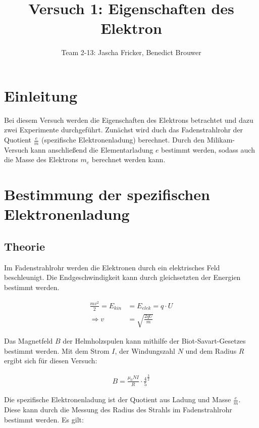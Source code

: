 \documentclass[11pt, a4paper]{article}
\title{Versuch 1: Eigenschaften des Elektron}
\author{Team 2-13: Jascha Fricker, Benedict Brouwer}
\begin{document}
    \maketitle


    \tableofcontents

    \newpage

    \section{Einleitung}

    Bei diesem Versuch werden die Eigenschaften des Elektrons betrachtet und dazu zwei Experimente durchgeführt. Zunächst wird duch das Fadenstrahlrohr
    der Quotient $\frac{e}{m}$ (spezifische Elektronenladung) berechnet. Durch den Milikam-Versuch kann anschließend die Elementarladung $e$ bestimmt
    werden, sodass auch die Masse des Elektrons $m_e$ berechnet werden kann.

    \section{Bestimmung der spezifischen Elektronenladung}

    \subsection{Theorie}

    Im Fadenstrahlrohr werden die Elektronen durch ein elektrisches Feld beschleunigt. Die Endgeschwindigkeit kann durch gleichsetzten der Energien bestimmt werden.

    \begin{align}
    \frac{mv^2}{2} = E_{kin} &= E_{elek} = q \cdot U \label{geschw}\\
    \Rightarrow v &= \sqrt{\frac{2qU}{m}}
    \end{align}
    
    Das Magnetfeld $B$ der Helmholzspulen kann mithilfe der Biot-Savart-Gesetzes bestimmt werden.
    Mit dem Strom $I$, der Windungszahl $N$ und dem Radius $R$ ergibt sich für diesen Versuch:

    \begin{align}
        B = \frac{\mu_0 N I}{R} \cdot \frac{4}{5}^{\frac{3}{2}}
    \end{align}

    Die spezifische Elektronenladung ist der Quotient aus Ladung und Masse $\frac{e}{m}$.
    Diese kann durch die Messung des Radius des Strahls im Fadenstrahlrohr bestimmt werden. Es gilt:
\end{document}
